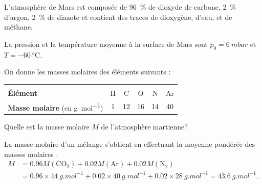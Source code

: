 
\hauteurLargeurCadreReponse		{7mm}{3.5cm}
\initialisationEntrainement



L'atmosphère de Mars est composée de \SI{96}{\percent}  de dioxyde de carbone,
 \SI{2}{\percent} d'argon,  \SI{2}{\percent} de diazote et contient des traces de dioxygène, d'eau,
et de méthane.

La pression et la température moyenne à la surface de Mars sont $p_0=\SI{6}{mbar}$
et $T=\SI{-60}{\celsius}$. 

On donne les masses molaires des éléments suivants :
		\begin{center}
			\begin{tabular}{@{} |l|ccccc| @{}}
			\hline&&&&&\\[-3.5mm]
			\textbf{Élément}							&	H	&	C	&	O	&	 N	&	Ar	\\[1mm]
			\textbf{Masse molaire} (en \si{g.mol^{-1}})	& 1		&	12	&	16	&	14	&	40 \\ \hline
			\end{tabular}		
		\end{center}


\debutEntrainement


\begin{enonce}
Quelle est la masse molaire $M$ de l'atmosphère martienne?
\end{enonce}


\begin{corrige}
La masse molaire d'un mélange s'obtient en effectuant la moyenne pondérée des masses molaires :
\begin{align*}
M & =\num{0.96}M\left(\text{CO}_{2}\right)+\num{0.02}M\left(\text{Ar}\right)+\num{0.02}M\left(\text{N}_{2}\right)\\
 & =\num{0.96}\times\SI{44}{g.mol^{-1}}+\num{0.02}\times\SI{40}{g.mol^{-1}}+\num{0.02}\times\SI{28}{g.mol^{-1}}=\SI{43.6}{g.mol^{-1}}.
\end{align*}

\end{corrige}

